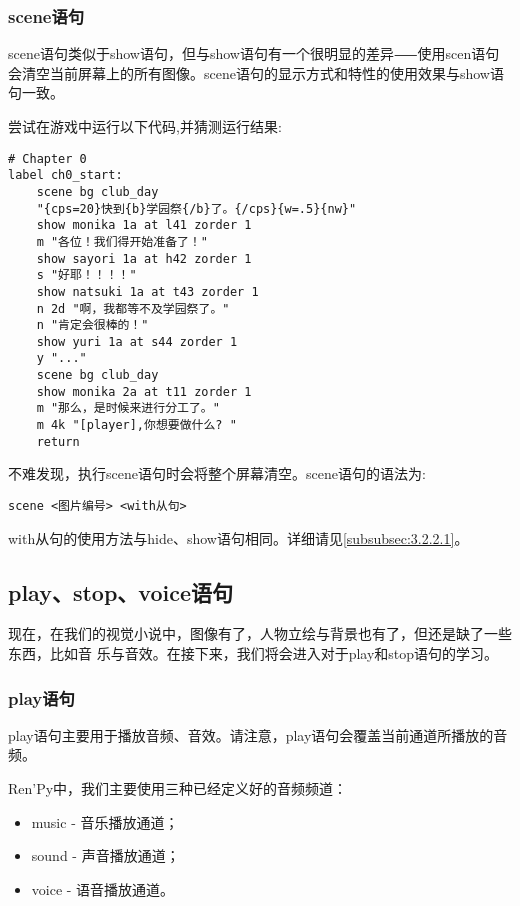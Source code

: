 \subsubsection{scene语句}
\label{subsubsec:3.2.2.3}

scene语句类似于show语句，但与show语句有一个很明显的差异⸺使用scen语句会清空当前屏幕上的所有图像。scene语句的显示方式和特性的使用效果与show语句一致。

尝试在游戏中运行以下代码,并猜测运行结果:
\begin{lstlisting}[caption=script-ch1.rpy]
# Chapter 0
label ch0_start:
    scene bg club_day
    "{cps=20}快到{b}学园祭{/b}了。{/cps}{w=.5}{nw}"
    show monika 1a at l41 zorder 1
    m "各位！我们得开始准备了！"
    show sayori 1a at h42 zorder 1
    s "好耶！！！！"
    show natsuki 1a at t43 zorder 1
    n 2d "啊，我都等不及学园祭了。"
    n "肯定会很棒的！"
    show yuri 1a at s44 zorder 1
    y "..."
    scene bg club_day
    show monika 2a at t11 zorder 1
    m "那么，是时候来进行分工了。"
    m 4k "[player],你想要做什么? "
    return
\end{lstlisting}

不难发现，执行scene语句时会将整个屏幕清空。scene语句的语法为:

\begin{lstlisting}[numbers=none]
scene <图片编号> <with从句>
\end{lstlisting}

with从句的使用方法与hide、show语句相同。详细请见\ref{subsubsec:3.2.2.1}。

\subsection{play、stop、voice语句}
现在，在我们的视觉小说中，图像有了，人物立绘与背景也有了，但还是缺了一些东西，比如音
乐与音效。在接下来，我们将会进入对于play和stop语句的学习。

\subsubsection{play语句}

play语句主要用于播放音频、音效。请注意，play语句会覆盖当前通道所播放的音频。

Ren'Py中，我们主要使用三种已经定义好的音频频道：

\begin{itemize}
    \item music - 音乐播放通道；
    \item sound - 声音播放通道；
    \item voice - 语音播放通道。 
\end{itemize}

